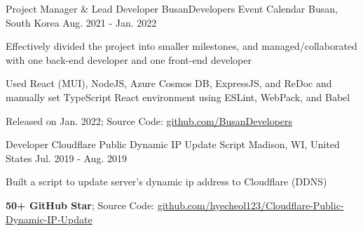 

\begin{cventries}

  \cventry
  {Project Manager \& Lead Developer} %
  {BusanDevelopers Event Calendar} %
  {Busan, South Korea} %
  {Aug. 2021 - Jan. 2022} %
  {
    \begin{cvitems} %
      \item {Effectively divided the project into smaller milestones, and managed/collaborated with one back-end developer and one front-end developer}
      \item {Used React (MUI), NodeJS, Azure Cosmos DB, ExpressJS, and ReDoc and manually set TypeScript React environment using ESLint, WebPack, and Babel}
      \item {Released on Jan. 2022; Source Code: \color{awesome}\underline{github.com/BusanDevelopers}}
    \end{cvitems}
  }

  \cventry
  {Developer} %
  {Cloudflare Public Dynamic IP Update Script} %
  {Madison, WI, United States} %
  {Jul. 2019 - Aug. 2019} %
  {
    \begin{cvitems} %
      \item {Built a script to update server's dynamic ip address to Cloudflare (DDNS)}
      \item {\textbf{50+ GitHub Star}; Source Code: \color{awesome}\underline{github.com/hyecheol123/Cloudflare-Public-Dynamic-IP-Update}}
    \end{cvitems}
  }

\end{cventries}
